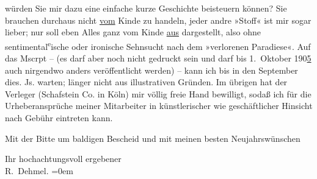 \pstart
           {\pb}würden Sie mir dazu eine einfache kurze Geschichte
               beisteuern können? Sie brauchen durchaus nicht \uline{vom}
               Kinde zu handeln, jeder andre »Stoff« ist mir sogar lieber; nur soll eben Alles ganz
               vom Kinde \uline{aus} dargestellt, also ohne sentimental\substVorne{}\textsuperscript{e}\substDazwischen{}ische\substHinten{} oder ironische Sehnsucht nach dem »verlorenen Paradiese«. Auf das Mscrpt –
               (es darf aber noch nicht gedruckt sein und darf bis 1. Oktober 190\uline{5} auch nirgendwo anders veröffentlicht werden) – kann ich bis in den
                  September dies. Js. warten; länger {\pb}nicht
               aus illustrativen Gründen. Im übrigen hat der Verleger (Schafstein {\kaufmannsund} Co. in Köln) mir völlig freie Hand bewilligt, sodaß ich
               für die Urheberansprüche meiner Mitarbeiter in künstlerischer wie geschäftlicher
               Hinsicht nach Gebühr eintreten kann.\pend
           
\pstart
           Mit der Bitte um baldigen Bescheid und mit meinen besten Neujahrswünschen\pend
           
\pstart
           Ihr hochachtungsvoll ergebener{\\[\baselineskip]}\spacefill\mbox{R. Dehmel.}\pend
           \leftskip=0em{}\endnumbering{}  
      